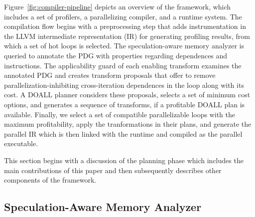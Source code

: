 Figure~\ref{fig:compiler-pipeline} depicts an overview of the \name
framework, which includes a set of profilers, a parallelizing compiler,
and a runtime system.
%
The compilation flow begins with a preprocessing step that adds
instrumentation in the LLVM intermediate representation (IR) for
generating profiling results, from which a set of hot
loops is selected.
The speculation-aware memory analyzer
is queried to annotate the PDG with properties regarding dependences and
instructions. The applicability guard of each enabling
transform examines the annotated PDG and creates transform
proposals that offer to remove parallelization-inhibiting cross-iteration
dependences in the loop along with its cost. A DOALL planner considers
these proposals, selects a set of minimum cost options, and generates a sequence
of transforms, if a profitable DOALL plan is available.
Finally, we select a set of
compatible parallelizable loops with the maximum profitability, apply the
tranformations in their plans, and generate the parallel IR which is
then linked with the runtime and compiled as the parallel executable.

 This section begins with a discussion of the planning phase which
 includes the main contributions of this paper and then subsequently
 describes other components of the framework.

\subsection{Speculation-Aware Memory Analyzer}
\label{sama}

%
%
%
%
%

